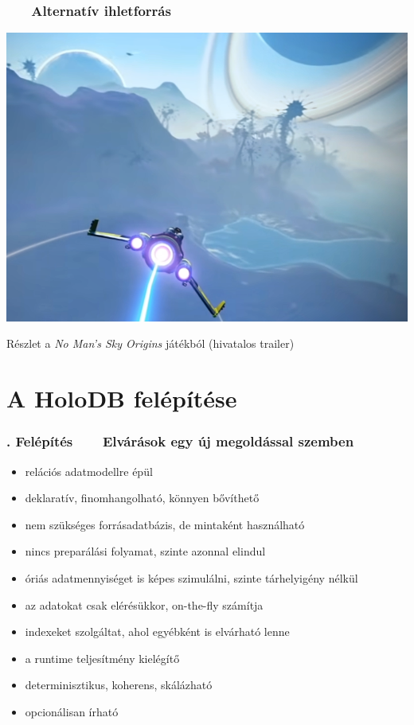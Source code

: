 \documentclass[
    aspectratio=169,
]{beamer}
\newcommand{\slidetitle}[2]{\frametitle{{\small #1 ~ \ding{226} ~ } \normalsize \textbf{#2} }}
\begin{document}
\begin{frame}
    \slidetitle{\sectionshorttitle}{Alternatív ihletforrás}
    
    \centering
    
    \includegraphics[height=0.8\textheight]{image/nomanssky}
    
    \smallskip
    
    \footnotesize{Részlet a \textit{No Man's Sky Origins} játékból (hivatalos trailer)}
\end{frame}

\section{A HoloDB felépítése}
\def\sectionshorttitle{. Felépítés}

\begin{frame}
    \slidetitle{\sectionshorttitle}{Elvárások egy új megoldással szemben}
    
    \begin{itemize}
        \setlength\itemsep{0.5em}
        \item {\color{red}relációs} adatmodellre épül
        \item {\color{red}deklaratív}, finomhangolható, könnyen bővíthető
        \item nem szükséges forrásadatbázis, de mintaként használható
        \item {\color{red}nincs preparálás}i folyamat, szinte azonnal elindul
        \item óriás adatmennyiséget is képes szimulálni, szinte {\color{red}tárhelyigény nélkül}
        \item az adatokat csak elérésükkor, on-the-fly számítja
        \item indexeket szolgáltat, ahol egyébként is elvárható lenne
        \item a runtime teljesítmény kielégítő
        \item determinisztikus, {\color{red}koherens}, skálázható
        \item opcionálisan írható
    \end{itemize}
\end{frame}
\end{document}
